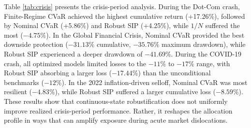 \documentclass[smallextended]{svjour3}
\begin{document}
\begin{table}[htbp]
\centering
\caption{Approximate crisis-period performance using complete 21-day holding periods classified by holding-period end date}
\label{tab:crisis}
\end{table}

Table \ref{tab:crisis} presents the crisis-period analysis. During the Dot-Com crash, Finite-Regime CVaR achieved the highest cumulative return (+17.26\%), followed by Nominal CVaR (+5.86\%) and Robust SIP (+4.25\%), while $1/N$ suffered the most ($-4.75\%$). In the Global Financial Crisis, Nominal CVaR provided the best downside protection ($-31.13\%$ cumulative, $-35.76\%$ maximum drawdown), while Robust SIP experienced a deeper drawdown of $-41.69\%$. During the COVID-19 crash, all optimized models limited losses to the $-11\%$ to $-17\%$ range, with Robust SIP absorbing a larger loss ($-17.44\%$) than the unconditional benchmarks ($-12\%$). In the 2022 inflation-driven selloff, Nominal CVaR was most resilient ($-4.83\%$), while Robust SIP suffered a larger cumulative loss ($-8.59\%$). These results show that continuous-state robustification does not uniformly improve realized crisis-period performance. Rather, it reshapes the allocation profile in ways that can amplify exposure during acute market dislocations.
\end{document}
